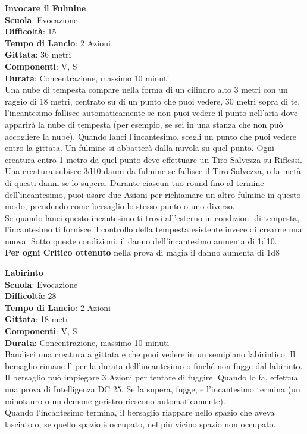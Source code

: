 \begin{multicols}{2}
\medskip\textbf{Invocare il Fulmine}\\
\textbf{Scuola}: Evocazione\\
\textbf{Difficoltà}:  15\\
\textbf{Tempo di Lancio}: 2 Azioni\\
\textbf{Gittata}: 36 metri\\
\textbf{Componenti}: V, S\\
\textbf{Durata}: Concentrazione, massimo 10 minuti\\
Una nube di tempesta compare nella forma di un cilindro alto 3 metri con un raggio di 18 metri, centrato su di un punto che puoi vedere, 30 metri sopra di te. l'incantesimo fallisce automaticamente se non puoi vedere il punto nell'aria dove apparirà la nube di tempesta (per esempio, se sei in una stanza che non può accogliere la nube). Quando lanci l'incantesimo, scegli un punto che puoi vedere entro la gittata. Un fulmine si abbatterà dalla nuvola su quel punto. Ogni creatura entro 1 metro da  quel punto deve effettuare un Tiro Salvezza su Riflessi. Una creatura  subisce 3d10 danni da fulmine se fallisce il Tiro Salvezza, o la metà di questi danni se lo supera. Durante ciascun tuo round fino al termine dell'incantesimo, puoi usare due Azioni per richiamare un altro fulmine in questo modo, prendendo come bersaglio lo stesso punto o uno diverso.\\
Se quando lanci questo incantesimo ti trovi all'esterno in condizioni di tempesta, l'incantesimo ti fornisce il controllo della tempesta esistente invece di crearne una nuova. Sotto queste condizioni, il danno dell'incantesimo aumenta di 1d10. \\
\textbf{Per ogni Critico ottenuto} nella prova di magia il danno aumenta di 1d8

\medskip\textbf{Labirinto}\\
\textbf{Scuola}: Evocazione\\
\textbf{Difficoltà}:  28\\
\textbf{Tempo di Lancio}: 2 Azioni\\
\textbf{Gittata}: 18 metri\\
\textbf{Componenti}: V, S\\
\textbf{Durata}: Concentrazione, massimo 10 minuti\\
Bandisci una creatura a gittata e che puoi vedere in un semipiano labirintico. Il bersaglio rimane lì per la durata dell'incantesimo o finché non fugge dal labirinto. Il bersaglio può impiegare 3 Azioni per tentare di fuggire. Quando lo fa, effettua una prova di Intelligenza DC 25. Se la supera, fugge, e l'incantesimo termina (un minotauro o un demone goristro riescono automaticamente).\\
Quando l'incantesimo termina, il bersaglio riappare nello spazio che aveva lasciato o, se quello spazio è occupato, nel più vicino spazio non occupato. 


\end{multicols}
